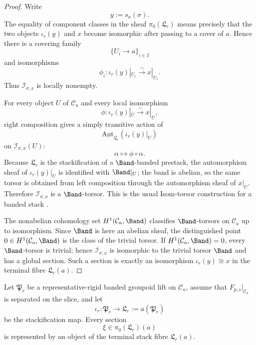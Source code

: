 \begin{proof}
Write
\[
y:=s_a(\sigma).
\]
The equality of component classes in the sheaf $\pi_0(\mathfrak L_r)$ means precisely that the two objects $\iota_r(y)$ and $x$ become isomorphic after passing to a cover of $a$. Hence there is a covering family
\[
\{U_i\to a\}_{i\in I}
\]
and isomorphisms
\[
\phi_i:\iota_r(y)|_{U_i}\xrightarrow{\sim}x|_{U_i}.
\]
Thus $\mathcal I_{\sigma,x}$ is locally nonempty.

For every object $U$ of $\mathcal C_a$ and every local isomorphism
\[
\phi:\iota_r(y)|_U\xrightarrow{\sim}x|_U,
\]
right composition gives a simply transitive action of
\[
\underline{\mathrm{Aut}}_{\mathfrak L_r}(\iota_r(y)|_U)
\]
on $\mathcal I_{\sigma,x}(U)$:
\[
\alpha\longmapsto \phi\circ\alpha.
\]
Because $\mathfrak L_r$ is the stackification of a $\Band$-banded prestack, the automorphism sheaf of $\iota_r(y)|_U$ is identified with $\Band|_U$; the band is abelian, so the same torsor is obtained from left composition through the automorphism sheaf of $x|_U$. Therefore $\mathcal I_{\sigma,x}$ is a $\Band$-torsor. This is the usual Isom-torsor construction for a banded stack \cite[Chap.~III]{MacLaneMoerdijk1994}.

The nonabelian cohomology set $H^1(\mathcal C_a,\Band)$ classifies $\Band$-torsors on $\mathcal C_a$ up to isomorphism. Since $\Band$ is here an abelian sheaf, the distinguished point $0\in H^1(\mathcal C_a,\Band)$ is the class of the trivial torsor. If $H^1(\mathcal C_a,\Band)=0$, every $\Band$-torsor is trivial; hence $\mathcal I_{\sigma,x}$ is isomorphic to the trivial torsor $\Band$ and has a global section. Such a section is exactly an isomorphism $\iota_r(y)\cong x$ in the terminal fibre $\mathfrak L_r(a)$.
\end{proof}

\begin{lemma}\label{lem:component-section-descent-object}
Let $\mathfrak P_r$ be a representative-rigid banded groupoid lift on
$\mathcal C_a$, assume that $F_{p,s}|_{\mathcal C_a}$ is
separated on the slice, and let
\[
\iota_r:\mathfrak P_r\to\mathfrak L_r:=a(\mathfrak P_r)
\]
be the stackification map. Every section
\[
\xi\in\pi_0(\mathfrak L_r)(a)
\]
is represented by an object of the terminal stack fibre $\mathfrak L_r(a)$.
\end{lemma}

